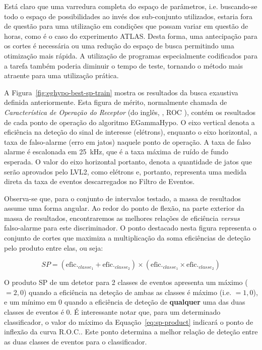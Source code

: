 Está claro que uma varredura completa do espaço de parâmetros,
i.e. buscando-se todo o espaço de possibilidades ao invés dos sub-conjunto
utilizados, estaria fora de questão para uma utilização em condições que
possam variar em questão de horas, como é o caso do experimento ATLAS. Desta
forma, uma antecipação para os cortes é necessária ou uma redução do
espaço de busca permitindo uma otimização mais rápida. A utilização de
programas especialmente codificados para a tarefa também poderia diminuir o
tempo de teste, tornando o método mais atraente para uma utilização prática.

A Figura~\ref{fig:eghypo-best-sp-train} mostra os resultados da busca
exaustiva definida anteriormente. Esta figura de mérito, normalmente chamada
de \textit{Característica de Operação do Receptor} (do inglês,
, ROC \cite{vantrees}), contém os
resultados de cada ponto de operação do algoritmo EGammaHypo. O eixo vertical
denota a eficiência na deteção do sinal de interesse (elétrons), enquanto o
eixo horizontal, a taxa de falso-alarme (erro em jatos) naquele ponto de
operação. A taxa de falso alarme é escalonada em 25~kHz, que é a taxa máxima
de ruído de fundo esperada. O valor do eixo horizontal portanto, denota a
quantidade de jatos que serão aprovados pelo LVL2, como elétrons e, portanto,
representa uma medida direta da taxa de eventos descarregados no Filtro de
Eventos.

Observa-se que, para o conjunto de intervalos testado, a massa de resultados
assume uma forma angular. Ao redor do ponto de flexão, na parte exterior da
massa de resultados, encontraremos as melhores relações de eficiência
\textit{versus} falso-alarme para este discriminador. O ponto destacado nesta
figura representa o conjunto de cortes que maximiza a multiplicação da soma
eficiências de deteção pelo produto entre elas, ou seja:

\begin{equation}
SP = (\text{efic.}_{classe_1} + \text{efic.}_{classe_2}) \times
(\text{efic.}_{classe_1} \times \text{efic.}_{classe_2})
\label{eq:sp-product}
\end{equation}

O produto SP de um detetor para 2 classes de eventos apresenta um máximo
($=2,0$) quando a eficiência na deteção de ambas as classes é máximo
(i.e. $=1,0$), e um mínimo em $0$ quando a eficiência de deteção de
\textbf{qualquer} uma das duas classes de eventos é $0$. É interessante notar
que, para um determinado classificador, o valor do máximo da
Equação~\ref{eq:sp-product} indicará o ponto de inflexão da curva R.O.C.. Este
ponto determina a melhor relação de deteção entre as duas classes de eventos
para o classificador.

